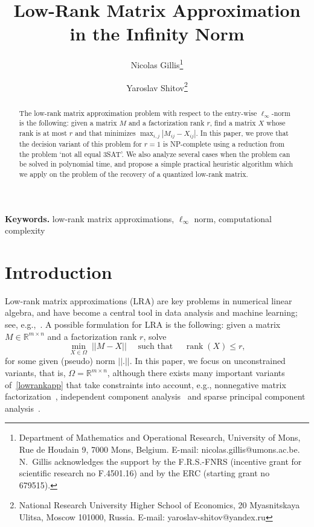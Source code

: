 \documentclass[a4paper,11pt]{article}
\title{Low-Rank Matrix Approximation in the Infinity Norm}
\author{Nicolas Gillis\thanks{Department of Mathematics and Operational Research, 
University of Mons, Rue de Houdain 9, 7000 Mons, Belgium. 
 E-mail: nicolas.gillis@umons.ac.be. 
 N.~Gillis acknowledges the support by the F.R.S.-FNRS (incentive grant for scientific research no F.4501.16) and 
by the ERC (starting grant no 679515).} \and 
 Yaroslav Shitov\thanks{National Research University Higher School of Economics, 20 Myasnitskaya Ulitsa,
Moscow 101000, Russia. E-mail: yaroslav-shitov@yandex.ru}}
\date{}
\numberwithin{equation}{section}
\DeclareMathOperator{\rank}{rank}
\begin{document}
\maketitle

\begin{abstract}
The low-rank matrix approximation problem with respect 
to the entry-wise $\ell_{\infty}$-norm is the following: given a matrix $M$ and a factorization rank $r$, 
find a matrix $X$ whose rank is at most $r$ and that minimizes $\max_{i,j} |M_{ij} - X_{ij}|$. 
In this paper, we prove that the decision variant of this problem for $r=1$ is NP-complete using a reduction from the problem `not all equal 3SAT'. %
 We also analyze several cases when the problem can be solved in polynomial time, %
and propose a simple practical heuristic algorithm which we apply on the problem of the recovery of a quantized low-rank matrix. 
\end{abstract} 

\textbf{Keywords.} low-rank matrix approximations, $\ell_{\infty}$ norm, computational complexity 




\section{Introduction}


Low-rank matrix approximations (LRA) are key problems in numerical linear algebra, and have become a central tool in data analysis and machine learning; see, e.g.,~\cite{UHZB14}. 
A possible formulation for LRA is the following: given a matrix $M \in \mathbb{R}^{m \times n}$ and a factorization rank $r$, solve 
\begin{equation}  \label{lowrankapp}
\min_{X \in \Omega} \; ||M - X|| \quad \text{ such that } \quad \rank(X) \leq r, 
\end{equation} 
for some given (pseudo) norm $||.||$. In this paper, we focus on unconstrained variants, that is, $\Omega = \mathbb{R}^{m \times n}$, although there exists many important variants of~\eqref{lowrankapp} that take constraints into account, e.g., 
nonnegative matrix factorization~\cite{LS99}, 
independent component analysis~\cite{C94} and 
sparse principal component analysis~\cite{d2007direct}.  
\end{document}
